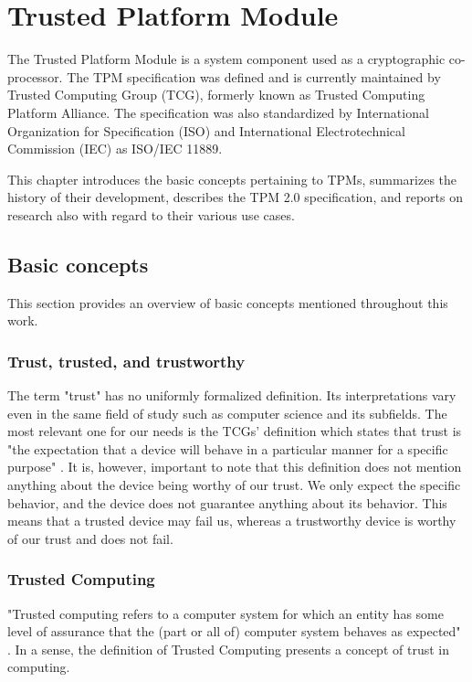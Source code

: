 \chapter{Trusted Platform Module}
The Trusted Platform Module is a system component used as a cryptographic co-processor. The TPM specification was defined and is currently maintained by Trusted Computing Group (TCG), formerly known as Trusted Computing Platform Alliance. The specification was also standardized by International Organization for Specification (ISO) and International Electrotechnical Commission (IEC) as ISO/IEC 11889.

This chapter introduces the basic concepts pertaining to TPMs, summarizes the history of their development, describes the TPM 2.0 specification, and reports on research also with regard to their various use cases. 

\section{Basic concepts}
This section provides an overview of basic concepts mentioned throughout this work.

\subsection{Trust, trusted, and trustworthy}\label{sec:trust-def}
The term "trust" has no uniformly formalized definition. Its interpretations vary even in the same field of study such as computer science and its subfields. The most relevant one for our needs is the TCGs' definition which states that trust is "the expectation that a device will behave in a particular manner for a specific purpose" \cite{tcg_arch_overview}. It is, however, important to note that this definition does not mention anything about the device being worthy of our trust. We only expect the specific behavior, and the device does not guarantee anything about its behavior. This means that a trusted device may fail us, whereas a trustworthy device is worthy of our trust and does not fail.

\subsection{Trusted Computing}\label{sec:tc}
"Trusted computing refers to a computer system for which an entity has some level of assurance that the (part or all of) computer system behaves as expected" \cite{mitchell2005trusted}. In a sense, the definition of Trusted Computing presents a concept of trust in computing.

